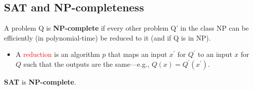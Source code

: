\subsection{SAT and NP-completeness}
A problem Q is \textbf{\textcolor{NavyBlue}{NP-complete}} if every other problem Q' in the class NP can be efficiently (in polynomial-time) be reduced to it (and if Q is in NP).
\begin{itemize}
    \item A \textcolor{red}{reduction} is an algorithm $p$ that maps an input $x^\prime$ for $Q^\prime$ to an input $x$ for $Q$ such that the outputs are the same—e.g., $Q(x) = Q^\prime(x^\prime)$.
\end{itemize}

\textbf{SAT} is \textbf{\textcolor{NavyBlue}{NP-complete}}.

\newpage